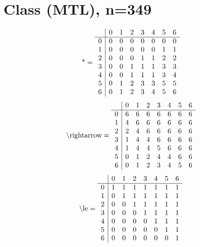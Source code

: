 \documentclass[11pt]{article}
\begin{document}
\section{Class (MTL), n=349}
\[\text{*} = 
\begin{array}{r | r r r r r r r}
 & 0 & 1 & 2 & 3 & 4 & 5 & 6 \\ \hline
0 & 0 & 0 & 0 & 0 & 0 & 0 & 0 \\
1 & 0 & 0 & 0 & 0 & 0 & 1 & 1 \\
2 & 0 & 0 & 0 & 1 & 1 & 2 & 2 \\
3 & 0 & 0 & 1 & 1 & 1 & 3 & 3 \\
4 & 0 & 0 & 1 & 1 & 1 & 3 & 4 \\
5 & 0 & 1 & 2 & 3 & 3 & 5 & 5 \\
6 & 0 & 1 & 2 & 3 & 4 & 5 & 6 \\
\end{array}
\]
\[\text{\textbackslash rightarrow} = 
\begin{array}{r | r r r r r r r}
 & 0 & 1 & 2 & 3 & 4 & 5 & 6 \\ \hline
0 & 6 & 6 & 6 & 6 & 6 & 6 & 6 \\
1 & 4 & 6 & 6 & 6 & 6 & 6 & 6 \\
2 & 2 & 4 & 6 & 6 & 6 & 6 & 6 \\
3 & 1 & 4 & 4 & 6 & 6 & 6 & 6 \\
4 & 1 & 4 & 4 & 5 & 6 & 6 & 6 \\
5 & 0 & 1 & 2 & 4 & 4 & 6 & 6 \\
6 & 0 & 1 & 2 & 3 & 4 & 5 & 6 \\
\end{array}
\]
\[\text{\textbackslash le} = 
\begin{array}{r | r r r r r r r}
 & 0 & 1 & 2 & 3 & 4 & 5 & 6 \\ \hline
0 & 1 & 1 & 1 & 1 & 1 & 1 & 1 \\
1 & 0 & 1 & 1 & 1 & 1 & 1 & 1 \\
2 & 0 & 0 & 1 & 1 & 1 & 1 & 1 \\
3 & 0 & 0 & 0 & 1 & 1 & 1 & 1 \\
4 & 0 & 0 & 0 & 0 & 1 & 1 & 1 \\
5 & 0 & 0 & 0 & 0 & 0 & 1 & 1 \\
6 & 0 & 0 & 0 & 0 & 0 & 0 & 1 \\
\end{array}
\]
\end{document}
